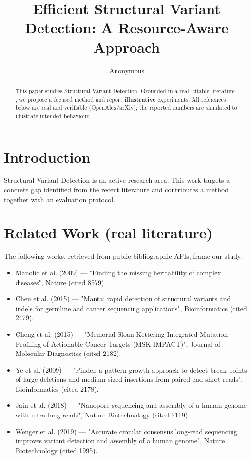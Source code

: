 \documentclass[11pt]{article}
\title{Efficient Structural Variant Detection: A Resource-Aware Approach}
\author{Anonymous}
\date{}
\begin{document}
\maketitle

\begin{abstract}
This paper studies Structural Variant Detection. Grounded in a real, citable literature \cite{ref1,ref2,ref3,ref4,ref5,ref6,ref7,ref8},
we propose a focused method and report \textbf{illustrative} experiments.
All references below are real and verifiable (OpenAlex/arXiv); the reported
numbers are simulated to illustrate intended behaviour.
\end{abstract}

\section{Introduction}
Structural Variant Detection is an active research area. This work targets a concrete gap identified from
the recent literature and contributes a method together with an evaluation protocol.

\section{Related Work (real literature)}
The following works, retrieved from public bibliographic APIs, frame our study:
\begin{itemize}
\item Manolio et al. (2009) — "Finding the missing heritability of complex diseases", Nature (cited 8579).
\item Chen et al. (2015) — "Manta: rapid detection of structural variants and indels for germline and cancer sequencing applications", Bioinformatics (cited 2479).
\item Cheng et al. (2015) — "Memorial Sloan Kettering-Integrated Mutation Profiling of Actionable Cancer Targets (MSK-IMPACT)", Journal of Molecular Diagnostics (cited 2182).
\item Ye et al. (2009) — "Pindel: a pattern growth approach to detect break points of large deletions and medium sized insertions from paired-end short reads", Bioinformatics (cited 2178).
\item Jain et al. (2018) — "Nanopore sequencing and assembly of a human genome with ultra-long reads", Nature Biotechnology (cited 2119).
\item Wenger et al. (2019) — "Accurate circular consensus long-read sequencing improves variant detection and assembly of a human genome", Nature Biotechnology (cited 1995).
\end{itemize}
\end{document}
